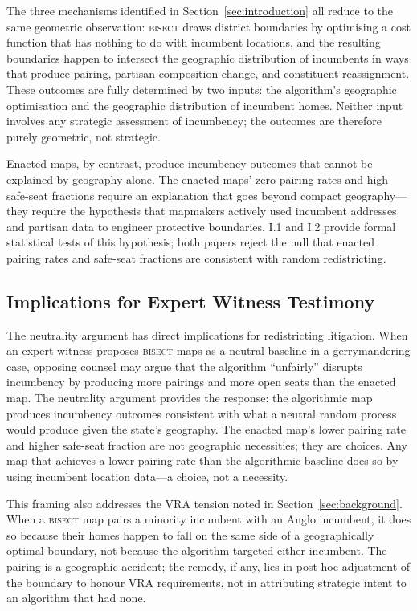 The three mechanisms identified in Section~\ref{sec:introduction} all reduce to the
same geometric observation: \textsc{bisect} draws district boundaries by optimising a
cost function that has nothing to do with incumbent locations, and the resulting
boundaries happen to intersect the geographic distribution of incumbents in ways that
produce pairing, partisan composition change, and constituent reassignment. These
outcomes are fully determined by two inputs: the algorithm's geographic optimisation
and the geographic distribution of incumbent homes. Neither input involves any strategic
assessment of incumbency; the outcomes are therefore purely geometric, not strategic.

Enacted maps, by contrast, produce incumbency outcomes that cannot be explained by
geography alone. The enacted maps' zero pairing rates and high safe-seat fractions require
an explanation that goes beyond compact geography---they require the hypothesis that
mapmakers actively used incumbent addresses and partisan data to engineer protective
boundaries. I.1 and I.2 provide formal statistical tests of this hypothesis; both
papers reject the null that enacted pairing rates and safe-seat fractions are consistent
with random redistricting.

\subsection{Implications for Expert Witness Testimony}

The neutrality argument has direct implications for redistricting litigation. When an
expert witness proposes \textsc{bisect} maps as a neutral baseline in a gerrymandering
case, opposing counsel may argue that the algorithm ``unfairly'' disrupts incumbency by
producing more pairings and more open seats than the enacted map. The neutrality argument
provides the response: the algorithmic map produces incumbency outcomes consistent with
what a neutral random process would produce given the state's geography. The enacted map's
lower pairing rate and higher safe-seat fraction are not geographic necessities; they are
choices. Any map that achieves a lower pairing rate than the algorithmic baseline does so
by using incumbent location data---a choice, not a necessity.

This framing also addresses the VRA tension noted in Section~\ref{sec:background}. When
a \textsc{bisect} map pairs a minority incumbent with an Anglo incumbent, it does so
because their homes happen to fall on the same side of a geographically optimal boundary,
not because the algorithm targeted either incumbent. The pairing is a geographic accident;
the remedy, if any, lies in post hoc adjustment of the boundary to honour VRA requirements,
not in attributing strategic intent to an algorithm that had none.
